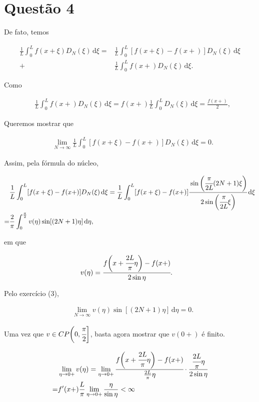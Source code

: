 \documentclass[12pt,a4paper]{article}
\begin{document}
	\section{Quest\~ao 4}
		\begin{flushright}
		\end{flushright}

		De fato, temos

		\begin{align}
			\frac{1}{L} \int_0^L f(x + \xi) D_N(\xi)\,\mathrm{d}\xi = &\frac{1}{L} \int_0^L [f(x + \xi) - f(x+)] D_N(\xi)\,\mathrm{d}\xi \\
			+ &\frac{1}{L} \int_0^L f(x+) D_N(\xi)\,\mathrm{d}\xi.
		\end{align}

		Como

		\begin{align}
			&\frac{1}{L} \int_0^L f(x+) D_N(\xi)\,\mathrm{d}\xi = f(x+) \frac{1}{L} \int_0^L D_N(\xi)\,\mathrm{d}\xi = \frac{f(x+)}{2},
		\end{align}

		Queremos mostrar que

		\begin{align}
			&\lim_{N \rightarrow \infty} \frac{1}{L} \int_0^L [f(x + \xi) - f(x+)] D_N(\xi)\,\mathrm{d}\xi = 0.
		\end{align}

		Assim, pela f\'ormula do n\'ucleo,

		\begin{align}
			&\frac{1}{L} \int_0^L [f(x + \xi) - f(x+)] D_N(\xi)\,\mathrm{d}\xi = \frac{1}{L} \int_0^L [f(x + \xi) - f(x+)] \cfrac{\sin\bigg(\cfrac{\pi}{2L}(2N+1)\xi\bigg)}{2\sin\bigg(\cfrac{\pi}{2L}\xi\bigg)} \,\mathrm{d}\xi \\
			= &\frac{2}{\pi} \int_0^{\frac{\pi}{2}} v(\eta) \sin[(2N+1)\eta] \,\mathrm{d}\eta,
		\end{align}

		em que

		\begin{align}
			&v(\eta) = \cfrac{f\bigg(x + \cfrac{2L}{\pi} \eta\bigg) - f(x+)}{2 \sin \eta}.
		\end{align}

		Pelo exerc\'icio (3),

		\begin{align}
			&\lim_{N \rightarrow \infty} v(\eta) \sin[(2N+1)\eta] \,\mathrm{d}\eta = 0.
		\end{align}

		Uma vez que $v \in CP\bigg(0, \cfrac{\pi}{2}\bigg]$, basta agora mostrar que $v(0+)$ \'e finito.

		\begin{align}
			&\lim_{\eta \rightarrow 0+} v(\eta) = \lim_{\eta \rightarrow 0+} \cfrac{f\bigg(x + \cfrac{2L}{\pi}\eta\bigg) - f(x+)}{\frac{2L}{\pi}\eta} \cdot \cfrac{\cfrac{2L}{\pi}\eta}{2 \sin \eta} \\
			= &f'(x+) \frac{L}{\pi} \lim_{\eta \rightarrow 0+} \frac{\eta}{\sin \eta} < \infty
		\end{align}
\end{document}

